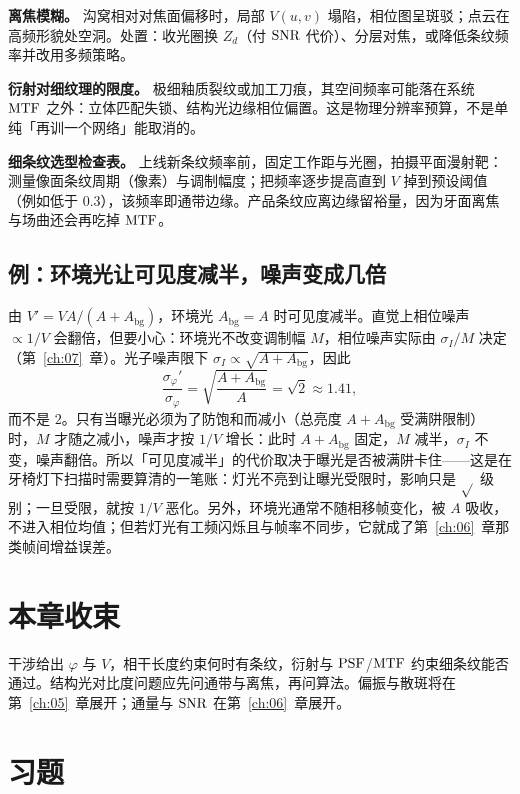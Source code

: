 \textbf{离焦模糊。} 沟窝相对对焦面偏移时，局部 $V(u,v)$ 塌陷，相位图呈斑驳；点云在高频形貌处空洞。处置：收光圈换 $Z_d$（付 $\mathrm{SNR}$ 代价）、分层对焦，或降低条纹频率并改用多频策略。

\textbf{衍射对细纹理的限度。} 极细釉质裂纹或加工刀痕，其空间频率可能落在系统 $\mathrm{MTF}$ 之外：立体匹配失锁、结构光边缘相位偏置。这是物理分辨率预算，不是单纯「再训一个网络」能取消的。


\textbf{细条纹选型检查表。} 上线新条纹频率前，固定工作距与光圈，拍摄平面漫射靶：测量像面条纹周期（像素）与调制幅度；把频率逐步提高直到 $V$ 掉到预设阈值（例如低于 $0.3$），该频率即通带边缘。产品条纹应离边缘留裕量，因为牙面离焦与场曲还会再吃掉 $\mathrm{MTF}$。

\subsection{例：环境光让可见度减半，噪声变成几倍}

由 $V'=VA/(A+A_{\mathrm{bg}})$，环境光 $A_{\mathrm{bg}}=A$ 时可见度减半。直觉上相位噪声 $\propto1/V$ 会翻倍，但要小心：环境光不改变调制幅 $M$，相位噪声实际由 $\sigma_I/M$ 决定（第~\ref{ch:07}~章）。光子噪声限下 $\sigma_I\propto\sqrt{A+A_{\mathrm{bg}}}$，因此
\[
  \frac{\sigma_\varphi'}{\sigma_\varphi}=\sqrt{\frac{A+A_{\mathrm{bg}}}{A}}=\sqrt2\approx1.41,
\]
而不是 $2$。只有当曝光必须为了防饱和而减小（总亮度 $A+A_{\mathrm{bg}}$ 受满阱限制）时，$M$ 才随之减小，噪声才按 $1/V$ 增长：此时 $A+A_{\mathrm{bg}}$ 固定，$M$ 减半，$\sigma_I$ 不变，噪声翻倍。所以「可见度减半」的代价取决于曝光是否被满阱卡住——这是在牙椅灯下扫描时需要算清的一笔账：灯光不亮到让曝光受限时，影响只是 $\sqrt{}$ 级别；一旦受限，就按 $1/V$ 恶化。另外，环境光通常不随相移帧变化，被 $A$ 吸收，不进入相位均值；但若灯光有工频闪烁且与帧率不同步，它就成了第~\ref{ch:06}~章那类帧间增益误差。

\section*{本章收束}
干涉给出 $\varphi$ 与 $V$，相干长度约束何时有条纹，衍射与 $\mathrm{PSF}$/$\mathrm{MTF}$ 约束细条纹能否通过。结构光对比度问题应先问通带与离焦，再问算法。偏振与散斑将在第~\ref{ch:05}~章展开；通量与 $\mathrm{SNR}$ 在第~\ref{ch:06}~章展开。

\section{习题}
\label{sec:ch03-exercises}

